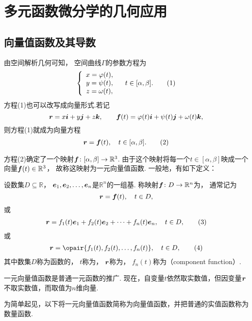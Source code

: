\section{多元函数微分学的几何应用}
\subsection{向量值函数及其导数}
由空间解析几何可知，
空间曲线\(\Gamma\)的参数方程为\begin{gather}
	\left\{ \begin{array}{c}
		x=\varphi(t), \\
		y=\psi(t), \\
		z=\omega(t),
	\end{array} \right. \quad
	t \in [\alpha,\beta].
	\tag1
\end{gather}方程(1)也可以改写成向量形式.若记\[
	\boldsymbol{r}=x\boldsymbol{i}+y\boldsymbol{j}+z\boldsymbol{k},
	\qquad
	\boldsymbol{f}(t)=\varphi(t)\boldsymbol{i}+\psi(t)\boldsymbol{j}+\omega(t)\boldsymbol{k},
\]
则方程(1)就成为向量方程\begin{gather}
	\mat{r}=\mat{f}(t), \quad t \in [\alpha,\beta].
	\tag2
\end{gather}

方程(2)确定了一个映射\(\boldsymbol{f}\colon [\alpha,\beta]\to\mathbb{R}^3\).
由于这个映射将每一个\(t\in[\alpha,\beta]\)映成一个向量\(\boldsymbol{f}(t)\in\mathbb{R}^3\)，
故称这映射为一元向量值函数.
一般地，有如下定义：
\begin{definition}
设数集\(D \subseteq \mathbb{R}\)，
\(\boldsymbol{e}_1,\boldsymbol{e}_2,\dotsc,\boldsymbol{e}_n\)是\(\mathbb{R}^n\)的一组基.
称映射\(\boldsymbol{f}\colon D\to\mathbb{R}^n\)为，
通常记为\[
	\boldsymbol{r}=\boldsymbol{f}(t), \quad t \in D,
\]
或\begin{gather}
	\mat{r}=f_1(t)\mat{e}_1+f_2(t)\mat{e}_2+\dotsb+f_n(t)\mat{e}_n, \quad t \in D,
	\tag3
\end{gather}
或\begin{gather}
	\mat{r}=\opair{f_1(t),f_2(t),\dotsc,f_n(t)}, \quad t \in D,
	\tag4
\end{gather}
其中数集\(D\)称为函数的，
\(t\)称为，
\(\boldsymbol{r}\)称为，
\(f_n(t)\)称为（component function）.
\end{definition}
一元向量值函数是普通一元函数的推广.
现在，自变量\(t\)依然取实数值，但因变量\(\boldsymbol{r}\)不取实数值，而取值为\(n\)维向量.

为简单起见，以下将一元向量值函数简称为向量值函数，并把普通的实值函数称为数量函数.

